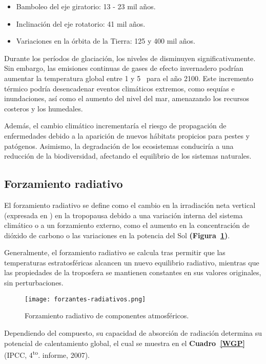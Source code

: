 \begin{itemize}
    \item Bamboleo del eje giratorio: 13 - 23 mil años.
    \item Inclinación del eje rotatorio: 41 mil años.
    \item Variaciones en la órbita de la Tierra: 125 y 400 mil años.
\end{itemize}

Durante los períodos de glaciación, los niveles de  disminuyen significativamente. Sin embargo, las emisiones continuas de gases de efecto invernadero podrían aumentar la temperatura global entre 1 y 5 \celsius\, para el año 2100. Este incremento térmico podría desencadenar eventos climáticos extremos, como sequías e inundaciones, así como el aumento del nivel del mar, amenazando los recursos costeros y los humedales.

Además, el cambio climático incrementaría el riesgo de propagación de enfermedades debido a la aparición de nuevos hábitats propicios para pestes y patógenos. Asimismo, la degradación de los ecosistemas conduciría a una reducción de la biodiversidad, afectando el equilibrio de los sistemas naturales.

\subsection{Forzamiento radiativo}

El forzamiento radiativo se define como el cambio en la irradiación neta vertical (expresada en \wattpersquaremetrenp) en la tropopausa debido a una variación interna del sistema climático o a un forzamiento externo, como el aumento en la concentración de dióxido de carbono o las variaciones en la potencia del Sol \textbf{(Figura~\ref{CGWP})}. 

Generalmente, el forzamiento radiativo se calcula tras permitir que las temperaturas estratosféricas alcancen un nuevo equilibrio radiativo, mientras que las propiedades de la troposfera se mantienen constantes en sus valores originales, sin perturbaciones. 


\begin{figure}[!htbp]
\begin{center}
\texttt{[image: forzantes-radiativos.png]}
\caption{Forzamiento radiativo de componentes atmosféricos.}
\label{CGWP}
\end{center}
\end{figure}

Dependiendo del compuesto, su capacidad de absorción de radiación determina su potencial de calentamiento global, el cual se muestra en el \textbf{Cuadro~\ref{WGP}} (IPCC, \textup{4\textsuperscript{to}.} informe, 2007).


